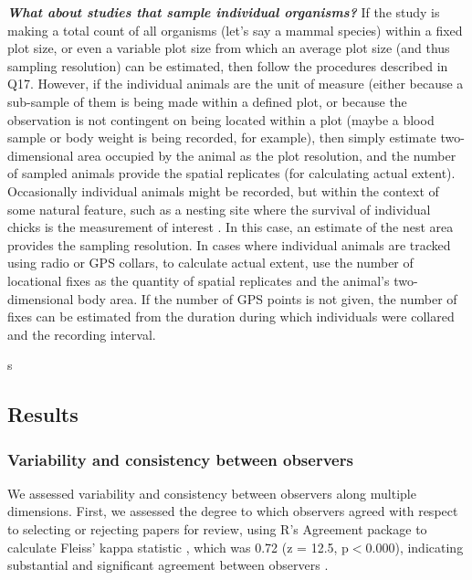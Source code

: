 \documentclass[12pt]{article}
\begin{document}
\begin{enumerate}
  \Hitem \emph{\textbf{What about studies that sample individual organisms?}} If the study is making a total count of all organisms (let's say a mammal species) within a fixed plot size, or even a variable plot size from which an average plot size (and thus sampling resolution) can be estimated, then follow the procedures described in Q17. However, if the individual animals are the unit of measure (either because a sub-sample of them is being made within a defined plot, or because the observation is not contingent on being located within a plot (maybe a blood sample or body weight is being recorded, for example), then simply estimate two-dimensional area occupied by the animal as the plot resolution, and the number of sampled animals provide the spatial replicates (for calculating actual extent). Occasionally individual animals might be recorded, but within the context of some natural feature, such as a nesting site where the survival of individual chicks is the measurement of interest \cite{roche_relative_2008}. In this case, an estimate of the nest area provides the sampling resolution. In cases where individual animals are tracked using radio or GPS collars, to calculate actual extent, use the number of locational fixes as the quantity of spatial replicates and the animal's two-dimensional body area. If the number of GPS points is not given, the number of fixes can be estimated from the duration during which individuals were collared and the recording interval.

\end{enumerate}

s\subsection*{Results}
\vspace{-4pt}

\subsubsection*{Variability and consistency between observers}
\vspace{-10pt}

We assessed variability and consistency between observers along multiple dimensions. First, we assessed the degree to which observers agreed with respect to selecting or rejecting papers for review, using R's Agreement package \cite{yu_agreement:_2012} to calculate Fleiss' kappa statistic \cite{fleiss_measuring_1971}, which was 0.72 (z = 12.5, p$<$0.000), indicating substantial and significant agreement between observers \cite{landis_measurement_1977}. 
\end{document}
